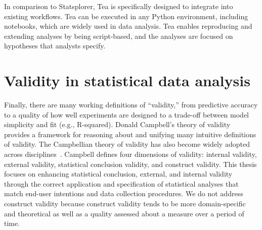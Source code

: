 In comparison to Statsplorer, Tea is specifically designed to integrate into
existing workflows. Tea can be executed in any Python environment, including
notebooks, which are widely used in data analysis. Tea enables reproducing and
extending analyses by being script-based, and the analyses are focused on
hypotheses that analysts specify. 



\section{Validity in statistical data analysis}
Finally, there are many working definitions of ``validity,'' from predictive
accuracy to a quality of how well experiments are designed to a trade-off
between model simplicity and fit (e.g., R-squared). Donald Campbell's theory of
validity~\cite{shadish2010campbell} provides a framework for reasoning about and
unifying many intuitive definitions of validity. The Campbellian theory of
validity has also become widely adopted across
disciplines~\cite{shadish2010campbell}. Campbell defines four dimensions of
validity: internal validity, external validity, statistical conclusion validity,
and construct validity. This thesis focuses on enhancing statistical conclusion,
external, and internal validity through the correct application and
specification of statistical analyses that match end-user intentions and data
collection procedures. We do not address construct validity because construct
validity tends to be more domain-specific and theoretical as well as a quality
assessed about a measure over a period of time. 



